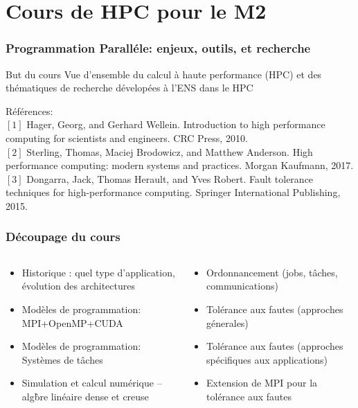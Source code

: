 \documentclass[compress,aspectratio=169]{beamer}
\begin{document}
\section{Cours de HPC pour le M2}

\begin{frame}
  \frametitle{Programmation Parall\'ele: enjeux, outils, et recherche}

  \begin{beamerboxesrounded}{But du cours}
    Vue d'ensemble du calcul \`a haute performance (HPC) et des th\'ematiques de recherche d\'evelop\'ees \`a l'ENS dans le HPC
  \end{beamerboxesrounded}

  \bigskip
  
  \small R\'ef\'erences:\\
  $[1]$ Hager, Georg, and Gerhard Wellein. Introduction to high performance computing for scientists and engineers. CRC Press, 2010.\\
  $[2]$ Sterling, Thomas, Maciej Brodowicz, and Matthew Anderson. High performance computing: modern systems and practices. Morgan Kaufmann, 2017.\\
  $[3]$ Dongarra, Jack, Thomas Herault, and Yves Robert. Fault tolerance techniques for high-performance computing. Springer International Publishing, 2015.
  
\end{frame}

\begin{frame}
  \frametitle{D\'ecoupage du cours}
  \begin{columns}
    \begin{column}{.45\linewidth}
      \begin{itemize}
      \item Historique : quel type d'application, \'evolution des architectures
      \item Mod\`eles de programmation: MPI+OpenMP+CUDA
      \item Mod\`eles de programmation: Syst\`emes de t\^aches
      \item Simulation et calcul num\'erique -- alg\`bre lin\'eaire dense et creuse
      \end{itemize}
    \end{column}\begin{column}{.45\linewidth}
      \begin{itemize}
      \item Ordonnancement (jobs, t\^aches, communications)
      \item Tol\'erance aux fautes (approches g\'enerales)
      \item Tol\'erance aux fautes (approches sp\'ecifiques aux applications)
      \item Extension de MPI pour la tol\'erance aux fautes
      \end{itemize}
    \end{column}
  \end{columns}
\end{frame}
\end{document}
